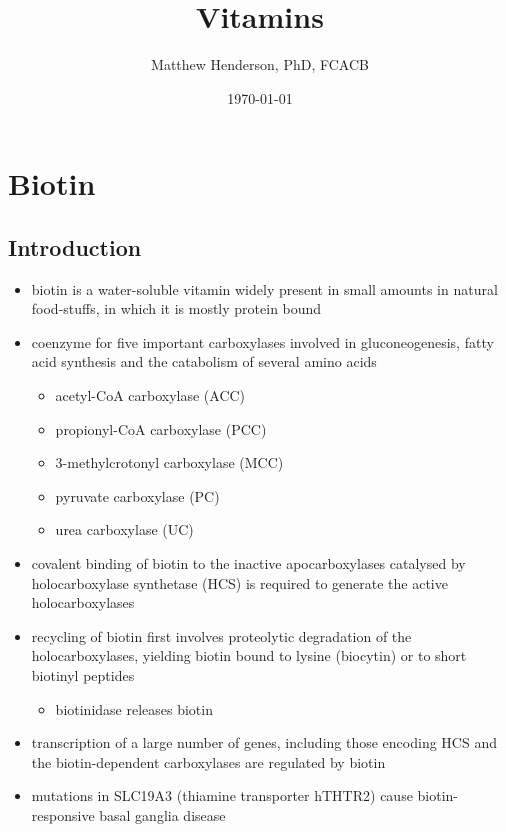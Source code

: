 \documentclass[12pt]{scrartcl}
\author{Matthew Henderson, PhD, FCACB}
\date{\today}
\title{Vitamins}
\begin{document}
\maketitle
\setcounter{tocdepth}{2}
\tableofcontents



\section{Biotin}
\label{sec:org1cc1b1e}
\subsection{Introduction}
\label{sec:orgf8d0cc3}
\begin{itemize}
\item biotin is a water-soluble vitamin widely present in small amounts in
natural food-stuffs, in which it is mostly protein bound
\item coenzyme for five important carboxylases involved in
gluconeogenesis, fatty acid synthesis and the catabolism of several
amino acids
\begin{itemize}
\item acetyl-CoA carboxylase (ACC)
\end{itemize}
\begin{itemize}
\item propionyl-CoA carboxylase (PCC)
\end{itemize}
\begin{itemize}
\item 3-methylcrotonyl carboxylase (MCC)
\end{itemize}
\begin{itemize}
\item pyruvate carboxylase (PC)
\end{itemize}
\begin{itemize}
\item urea carboxylase (UC)
\end{itemize}

\item covalent binding of biotin to the inactive apocarboxylases
catalysed by holocarboxylase synthetase (HCS) is required to
generate the active holocarboxylases
\item recycling of biotin first involves proteolytic degradation of the
holocarboxylases, yielding biotin bound to lysine (biocytin) or to
short biotinyl peptides
\begin{itemize}
\item biotinidase releases biotin
\end{itemize}
\item transcription of a large number of genes, including those encoding
HCS and the biotin-dependent carboxylases are regulated by biotin
\item mutations in SLC19A3 (thiamine transporter hTHTR2) cause
biotin-responsive basal ganglia disease
\end{itemize}
\end{document}
